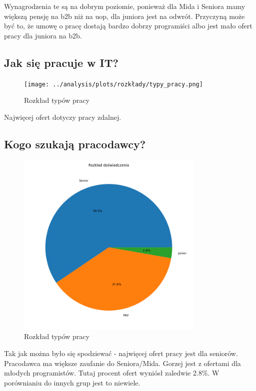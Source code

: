 \documentclass[a4paper]{article}
\begin{document}
\quad Wynagrodzenia te są na dobrym poziomie, ponieważ dla Mida i Seniora mamy większą pensję na b2b niż na uop, dla juniora jest na odwrót. Przyczyną może być to, że umowę o pracę dostają bardzo dobrzy programiści albo jest mało ofert pracy dla juniora na b2b.


\newpage
\subsection{Jak się pracuje w IT?}

\begin{figure}[H]
    \centering
    \texttt{[image: ../analysis/plots/rozkłady/typy\_pracy.png]}
    \caption{Rozkład typów pracy}
\end{figure}

\quad Najwięcej ofert dotyczy pracy zdalnej.


\subsection{Kogo szukają pracodawcy?}

\begin{figure}[H]
    \centering
    \includegraphics[width=0.8\textwidth]{../analysis/plots/rozkłady/rozkład_doświadczenia.png}
    \caption{Rozkład typów pracy}
\end{figure}

\quad Tak jak można było się spodziewać - najwięcej ofert pracy jest dla seniorów. Pracodawca ma większe zaufanie do Seniora/Mida. Gorzej jest z ofertami dla młodych programistów.
Tutaj procent ofert wyniósł zaledwie 2.8\%. W porównianiu do innych grup jest to niewiele.
\end{document}
